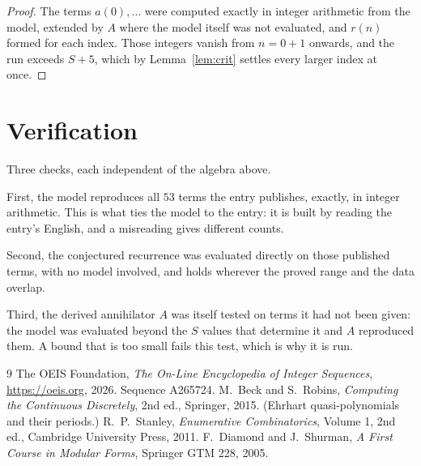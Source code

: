 \documentclass[11pt,a4paper]{article}
\theoremstyle{plain}
\theoremstyle{definition}
\begin{document}
\begin{proof}
The terms $a(0),\dots$ were computed exactly in integer arithmetic from the model, extended by
$A$ where the model itself was not evaluated, and $r(n)$ formed for each index. Those integers
vanish from $n=0+1$ onwards, and the run exceeds $S+5$, which by
Lemma~\ref{lem:crit} settles every larger index at once.
\end{proof}

\section{Verification}

Three checks, each independent of the algebra above.

First, the model reproduces all $53$ terms the entry publishes, exactly, in integer
arithmetic. This is what ties the model to the entry: it is built by reading the entry's
English, and a misreading gives different counts.

Second, the conjectured recurrence was evaluated directly on those published terms, with no
model involved, and holds wherever the proved range and the data overlap.

Third, the derived annihilator $A$ was itself tested on terms it had not been given: the model
was evaluated beyond the $S$ values that determine it and $A$ reproduced them. A bound that is
too small fails this test, which is why it is run.

\begin{thebibliography}{9}
 The OEIS Foundation, \emph{The On-Line Encyclopedia of Integer
Sequences}, \url{https://oeis.org}, 2026. Sequence A265724.
 M.~Beck and S.~Robins, \emph{Computing the Continuous Discretely},
2nd ed., Springer, 2015. (Ehrhart quasi-polynomials and their periods.)
 R.~P.~Stanley, \emph{Enumerative Combinatorics}, Volume 1, 2nd ed.,
Cambridge University Press, 2011.
 F.~Diamond and J.~Shurman, \emph{A First Course in Modular Forms},
Springer GTM 228, 2005.
\end{thebibliography}
\end{document}
